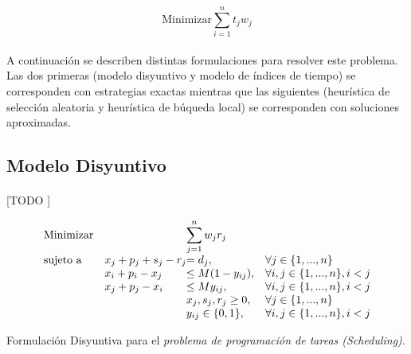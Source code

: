 \documentclass[spanish]{article}
\begin{document}
		\begin{equation}
		\label{eq:min-formula}
			\text{Minimizar} \displaystyle\sum\limits_{i = 1}^{n} t_{j}w_{j}
		\end{equation}

		\paragraph{}
		A continuación se describen distintas formulaciones para resolver este problema. Las dos primeras (modelo disyuntivo y modelo de índices de tiempo) se corresponden con estrategias exactas mientras que las siguientes (heurística de selección aleatoria y heurística de búqueda local) se corresponden con soluciones aproximadas.

		\subsection{Modelo Disyuntivo}
		\label{sec:disyuntive}

			\paragraph{}
			[TODO ]

			\begin{eqfloat}
				\begin{equation}
					\begin{array}{ll@{}ll}
						\text{Minimizar}	& & \displaystyle\sum\limits_{j = 1}^{n} w_{j}r_{j} & \\
						\text{sujeto a}		& x_{j} + p_{j} + s_{j} - r_{j} 	&= d_{j}, 		& \forall j \in \{1,...,n\}\\
															&	x_{i} + p_{i} - x_{j} 					&\leq M(1-y_{ij}), 	& \forall i,j \in \{1,...,n\},  i < j\\
															&	x_{j} + p_{j} - x_{i} 					&\leq My_{ij}, 	& \forall i,j \in \{1,...,n\},  i < j\\
															&                               	&	x_{j}, s_{j}, r_{j} 	\geq 0, 	& \forall j \in \{1,...,n\} \\
															&                               				&	y_{ij} 	\in \{0,1\}, 	& \forall i,j \in \{1,...,n\},  i < j
					\end{array}
				\end{equation}
				\caption{Formulación Disyuntiva para el \emph{problema de programación de tareas (Scheduling)}.}
				\label{eq:disjunctive-formulation}
			\end{eqfloat}
\end{document}
